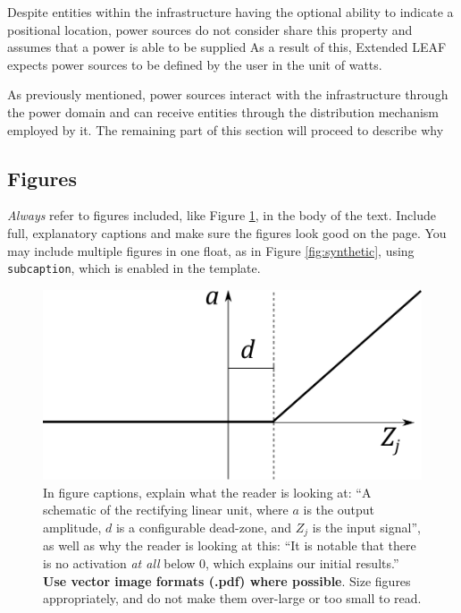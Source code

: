 \documentclass{l4proj}
\begin{document}
Despite entities within the infrastructure having the optional ability to indicate a positional location, power sources do not consider share this property and assumes that a power is able to be supplied
As a result of this, Extended LEAF expects power sources to be defined by the user in the unit of watts.


As previously mentioned, power sources interact with the infrastructure through the power domain and can receive entities through the distribution mechanism employed by it.
The remaining part of this section will proceed to describe why





\subsection{Figures}
\emph{Always} refer to figures included, like Figure \ref{fig:relu}, in the body of the text. Include full, explanatory captions and make sure the figures look good on the page.
You may include multiple figures in one float, as in Figure \ref{fig:synthetic}, using \texttt{subcaption}, which is enabled in the template.



\begin{figure}
    \centering
    \includegraphics[width=0.5\linewidth]{images/relu.pdf}    

    \caption{In figure captions, explain what the reader is looking at: ``A schematic of the rectifying linear unit, where $a$ is the output amplitude,
    $d$ is a configurable dead-zone, and $Z_j$ is the input signal'', as well as why the reader is looking at this: 
    ``It is notable that there is no activation \emph{at all} below 0, which explains our initial results.'' 
    \textbf{Use vector image formats (.pdf) where possible}. Size figures appropriately, and do not make them over-large or too small to read.
    }

    \label{fig:relu} 
\end{figure}
\end{document}
